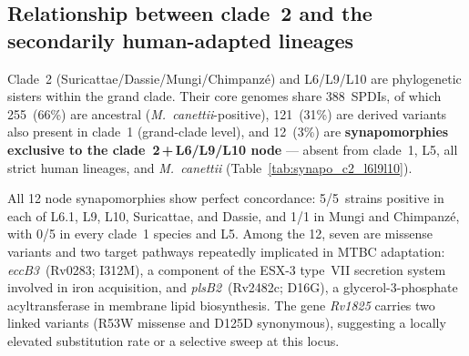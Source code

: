 \documentclass[11pt,a4paper]{article}
\begin{document}
\subsection{Relationship between clade~2 and the secondarily human-adapted lineages}
\label{sec:results:c2_vs_l6l9l10}

Clade~2 (Suricattae/Dassie/Mungi/Chimpanzé) and L6/L9/L10 are phylogenetic
sisters within the grand clade.
%
Their core genomes share 388~SPDIs, of which 255~(66\%) are ancestral
(\textit{M.~canettii}-positive), 121~(31\%) are derived variants also present
in clade~1 (grand-clade level), and 12~(3\%) are \textbf{synapomorphies
exclusive to the clade~2\,+\,L6/L9/L10 node} --- absent from clade~1, L5,
all strict human lineages, and \textit{M.~canettii}
(Table~\ref{tab:synapo_c2_l6l9l10}).

All 12 node synapomorphies show perfect concordance: 5/5~strains positive in
each of L6.1, L9, L10, Suricattae, and Dassie, and 1/1 in Mungi and
Chimpanzé, with 0/5 in every clade~1 species and L5.
%
Among the 12, seven are missense variants and two target pathways repeatedly
implicated in MTBC adaptation: \textit{eccB3}~(Rv0283; I312M), a component of
the ESX-3 type~VII secretion system involved in iron acquisition, and
\textit{plsB2}~(Rv2482c; D16G), a glycerol-3-phosphate acyltransferase in
membrane lipid biosynthesis.
%
The gene \textit{Rv1825} carries two linked variants (R53W missense and D125D
synonymous), suggesting a locally elevated substitution rate or a selective
sweep at this locus.
\end{document}
